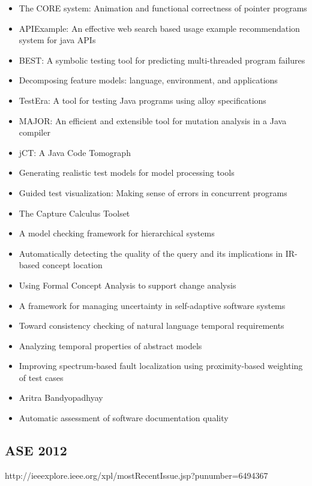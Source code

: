 {\begin{itemize}[itemsep=-1ex]
  \item The CORE system: Animation and functional correctness of pointer programs
  \item APIExample: An effective web search based usage example recommendation system for java APIs
  \item BEST: A symbolic testing tool for predicting multi-threaded program failures
  \item Decomposing feature models: language, environment, and applications
  \item TestEra: A tool for testing Java programs using alloy specifications
  \item MAJOR: An efficient and extensible tool for mutation analysis in a Java compiler
  \item jCT: A Java Code Tomograph
  \item Generating realistic test models for model processing tools
  \item Guided test visualization: Making sense of errors in concurrent programs
  \item The Capture Calculus Toolset
  \item A model checking framework for hierarchical systems
  \item Automatically detecting the quality of the query and its implications in IR-based concept location
  \item Using Formal Concept Analysis to support change analysis
  \item A framework for managing uncertainty in self-adaptive software systems
  \item Toward consistency checking of natural language temporal requirements
  \item Analyzing temporal properties of abstract models
  \item Improving spectrum-based fault localization using proximity-based weighting of test cases
  \item Aritra Bandyopadhyay
  \item Automatic assessment of software documentation quality
\end{itemize}
}

\subsection{ASE 2012}

http://ieeexplore.ieee.org/xpl/mostRecentIssue.jsp?punumber=6494367

